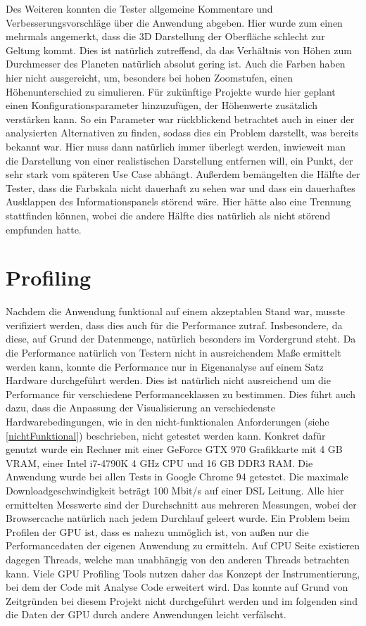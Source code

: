 Des Weiteren konnten die Tester allgemeine Kommentare und Verbesserungsvorschläge über die Anwendung abgeben. Hier wurde zum einen mehrmals angemerkt, dass die 3D Darstellung der Oberfläche schlecht zur Geltung kommt. Dies ist natürlich zutreffend, da das Verhältnis von Höhen zum Durchmesser des Planeten natürlich absolut gering ist. Auch die Farben haben hier nicht ausgereicht, um, besonders bei hohen Zoomstufen, einen Höhenunterschied zu simulieren. Für zukünftige Projekte wurde hier geplant einen Konfigurationsparameter hinzuzufügen, der Höhenwerte zusätzlich verstärken kann. So ein Parameter war rückblickend betrachtet auch in einer der analysierten Alternativen zu finden, sodass dies ein Problem darstellt, was bereits bekannt war. Hier muss dann natürlich immer überlegt werden, inwieweit man die Darstellung von einer realistischen Darstellung entfernen will, ein Punkt, der sehr stark vom späteren Use Case abhängt. Außerdem bemängelten die Hälfte der Tester, dass die Farbskala nicht dauerhaft zu sehen war und dass ein dauerhaftes Ausklappen des Informationspanels störend wäre. Hier hätte also eine Trennung stattfinden können, wobei die andere Hälfte dies natürlich als nicht störend empfunden hatte.

\section{Profiling}
Nachdem die Anwendung funktional auf einem akzeptablen Stand war, musste verifiziert werden, dass dies auch für die Performance zutraf. Insbesondere, da diese, auf Grund der Datenmenge, natürlich besonders im Vordergrund steht. Da die Performance natürlich von Testern nicht in ausreichendem Maße ermittelt werden kann, konnte die Performance nur in Eigenanalyse auf einem Satz Hardware durchgeführt werden. Dies ist natürlich nicht ausreichend um die Performance für verschiedene Performanceklassen zu bestimmen. Dies führt auch dazu, dass die Anpassung der Visualisierung an verschiedenste Hardwarebedingungen, wie in den nicht-funktionalen Anforderungen (siehe \ref{nichtFunktional}) beschrieben, nicht getestet werden kann. Konkret dafür genutzt wurde ein Rechner mit einer GeForce GTX 970 Grafikkarte mit 4 GB VRAM, einer Intel i7-4790K 4 GHz CPU und 16 GB DDR3 RAM. Die Anwendung wurde bei allen Tests in Google Chrome 94 getestet. Die maximale Downloadgeschwindigkeit beträgt 100 Mbit/s auf einer DSL Leitung. Alle hier ermittelten Messwerte sind der Durchschnitt aus mehreren Messungen, wobei der Browsercache natürlich nach jedem Durchlauf geleert wurde. Ein Problem beim Profilen der GPU ist, dass es nahezu unmöglich ist, von außen nur die Performancedaten der eigenen Anwendung zu ermitteln. Auf CPU Seite existieren dagegen Threads, welche man unabhängig von den anderen Threads betrachten kann. Viele GPU Profiling Tools nutzen daher das Konzept der Instrumentierung, bei dem der Code mit Analyse Code erweitert wird. Das konnte auf Grund von Zeitgründen bei diesem Projekt nicht durchgeführt werden und im folgenden sind die Daten der GPU durch andere Anwendungen leicht verfälscht.

